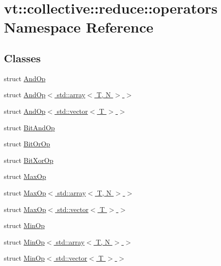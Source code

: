 \hypertarget{namespacevt_1_1collective_1_1reduce_1_1operators}{}\section{vt\+:\+:collective\+:\+:reduce\+:\+:operators Namespace Reference}
\label{namespacevt_1_1collective_1_1reduce_1_1operators}
\subsection*{Classes}
\begin{DoxyCompactItemize}
\item 
struct \hyperlink{structvt_1_1collective_1_1reduce_1_1operators_1_1_and_op}{And\+Op}
\item 
struct \hyperlink{structvt_1_1collective_1_1reduce_1_1operators_1_1_and_op_3_01std_1_1array_3_01_t_00_01_n_01_4_01_4}{And\+Op$<$ std\+::array$<$ T, N $>$ $>$}
\item 
struct \hyperlink{structvt_1_1collective_1_1reduce_1_1operators_1_1_and_op_3_01std_1_1vector_3_01_t_01_4_01_4}{And\+Op$<$ std\+::vector$<$ T $>$ $>$}
\item 
struct \hyperlink{structvt_1_1collective_1_1reduce_1_1operators_1_1_bit_and_op}{Bit\+And\+Op}
\item 
struct \hyperlink{structvt_1_1collective_1_1reduce_1_1operators_1_1_bit_or_op}{Bit\+Or\+Op}
\item 
struct \hyperlink{structvt_1_1collective_1_1reduce_1_1operators_1_1_bit_xor_op}{Bit\+Xor\+Op}
\item 
struct \hyperlink{structvt_1_1collective_1_1reduce_1_1operators_1_1_max_op}{Max\+Op}
\item 
struct \hyperlink{structvt_1_1collective_1_1reduce_1_1operators_1_1_max_op_3_01std_1_1array_3_01_t_00_01_n_01_4_01_4}{Max\+Op$<$ std\+::array$<$ T, N $>$ $>$}
\item 
struct \hyperlink{structvt_1_1collective_1_1reduce_1_1operators_1_1_max_op_3_01std_1_1vector_3_01_t_01_4_01_4}{Max\+Op$<$ std\+::vector$<$ T $>$ $>$}
\item 
struct \hyperlink{structvt_1_1collective_1_1reduce_1_1operators_1_1_min_op}{Min\+Op}
\item 
struct \hyperlink{structvt_1_1collective_1_1reduce_1_1operators_1_1_min_op_3_01std_1_1array_3_01_t_00_01_n_01_4_01_4}{Min\+Op$<$ std\+::array$<$ T, N $>$ $>$}
\item 
struct \hyperlink{structvt_1_1collective_1_1reduce_1_1operators_1_1_min_op_3_01std_1_1vector_3_01_t_01_4_01_4}{Min\+Op$<$ std\+::vector$<$ T $>$ $>$}

\end{DoxyCompactItemize}

